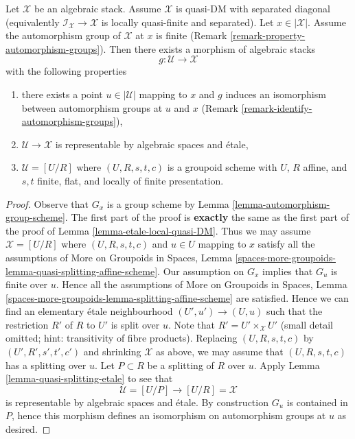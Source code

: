 \begin{lemma}
\label{lemma-etale-local-quasi-DM-at-x}
Let $\mathcal{X}$ be an algebraic stack. Assume $\mathcal{X}$ is
quasi-DM with separated diagonal (equivalently
$\mathcal{I}_\mathcal{X} \to \mathcal{X}$ is locally quasi-finite and
separated). Let $x \in |\mathcal{X}|$. Assume the
automorphism group of $\mathcal{X}$ at $x$ is finite
(Remark \ref{remark-property-automorphism-groups}).
Then there exists a morphism of algebraic stacks
$$
g : \mathcal{U} \longrightarrow \mathcal{X}
$$
with the following properties
\begin{enumerate}
\item there exists a point $u \in |\mathcal{U}|$ mapping to $x$ and
$g$ induces an isomorphism between automorphism groups at $u$ and $x$
(Remark \ref{remark-identify-automorphism-groups}),
\item $\mathcal{U} \to \mathcal{X}$ is representable by algebraic spaces and
\'etale,
\item $\mathcal{U} = [U/R]$ where $(U, R, s, t, c)$ is a groupoid
scheme with $U$, $R$ affine, and $s, t$ finite, flat, and
locally of finite presentation.
\end{enumerate}
\end{lemma}

\begin{proof}
Observe that $G_x$ is a group scheme by
Lemma \ref{lemma-automorphism-group-scheme}.
The first part of the proof is {\bf exactly} the same as the first part
of the proof of Lemma \ref{lemma-etale-local-quasi-DM}.
Thus we may assume $\mathcal{X} = [U/R]$ where $(U, R, s, t, c)$
and $u \in U$ mapping to $x$ satisfy all the assumptions of
More on Groupoids in Spaces, Lemma
\ref{spaces-more-groupoids-lemma-quasi-splitting-affine-scheme}.
Our assumption on $G_x$ implies that $G_u$ is finite over $u$.
Hence all the assumptions of
More on Groupoids in Spaces, Lemma
\ref{spaces-more-groupoids-lemma-splitting-affine-scheme}
are satisfied.
Hence we can find an elementary \'etale neighbourhood
$(U', u') \to (U, u)$ such that the restriction $R'$ of $R$ to $U'$
is split over $u$. Note that $R' = U' \times_\mathcal{X} U'$
(small detail omitted; hint: transitivity of fibre products).
Replacing $(U, R, s, t, c)$ by $(U', R', s', t', c')$ and shrinking
$\mathcal{X}$ as above, we may assume that $(U, R, s, t, c)$ has
a splitting over $u$. Let $P \subset R$ be a splitting of $R$ over $u$.
Apply Lemma \ref{lemma-quasi-splitting-etale} to see that
$$
\mathcal{U} = [U/P] \longrightarrow [U/R] = \mathcal{X}
$$
is representable by algebraic spaces and \'etale. By construction
$G_u$ is contained in $P$, hence this morphism defines an isomorphism
on automorphism groups at $u$ as desired.
\end{proof}

